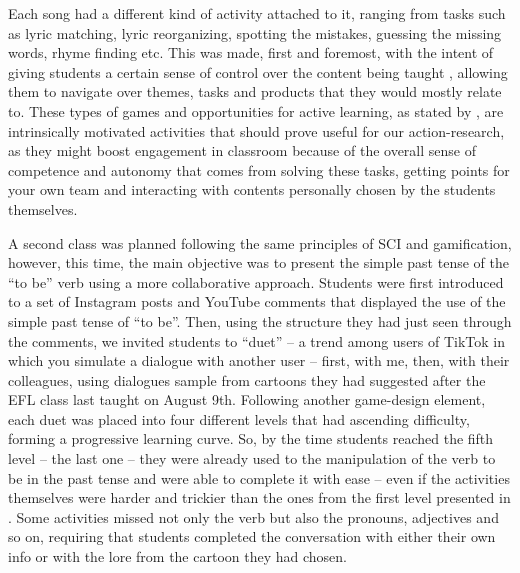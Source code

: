 \documentclass[english]{textolivre}
\begin{document}
Each song had a different kind of activity attached to it, ranging from tasks such as lyric matching, lyric reorganizing, spotting the mistakes, guessing the missing words, rhyme finding etc. This was made, first and foremost, with the intent of giving students a certain sense of control over the content being taught \cite{harmer2007practice, ryan2009promoting}, allowing them to navigate over themes, tasks and products that they would mostly relate to. These types of games and opportunities for active learning, as stated by \textcite{ryan2009promoting}, are intrinsically motivated activities that should prove useful for our action-research, as they might boost engagement in classroom because of the overall sense of competence and autonomy that comes from solving these tasks, getting points for your own team and interacting with contents personally chosen by the students themselves.

A second class was planned following the same principles of SCI and gamification, however, this time, the main objective was to present the simple past tense of the “to be” verb using a more collaborative approach. Students were first introduced to a set of Instagram posts and YouTube comments that displayed the use of the simple past tense of “to be”. Then, using the structure they had just seen through the comments, we invited students to “duet” – a trend among users of TikTok in which you simulate a dialogue with another user – first, with me, then, with their colleagues, using dialogues sample from cartoons they had suggested after the EFL class last taught on August 9th. Following another game-design element, each duet was placed into four different levels that had ascending difficulty, forming a progressive learning curve. So, by the time students reached the fifth level – the last one – they were already used to the manipulation of the verb to be in the past tense and were able to complete it with ease – even if the activities themselves were harder and trickier than the ones from the first level presented in . Some activities missed not only the verb but also the pronouns, adjectives and so on, requiring that students completed the conversation with either their own info or with the lore from the cartoon they had chosen.
\end{document}

